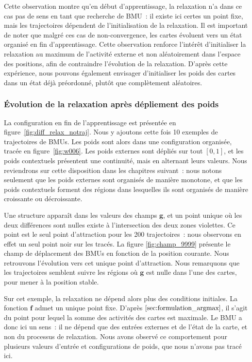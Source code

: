 \documentclass[../main]{subfiles}
\begin{document}
Cette observation montre qu'en début d'apprentissage, la relaxation n'a dans ce cas pas de \og sens \fg{} en tant que recherche de BMU~: il existe ici certes un point fixe, mais les trajectoires dépendent de l'initialisation de la relaxation. 
Il est important de noter que malgré ces cas de non-convergence, les cartes évoluent vers un état organisé en fin d'apprentissage. Cette observation renforce l'intérêt d'initialiser la relaxation au maximum de l'activité externe et non aléatoirement dans l'espace des positions, afin de contraindre l'évolution de la relaxation.
D'après cette expérience, nous pouvons également envisager d'initialiser les poids des cartes dans un état déjà préordonné, plutôt que complètement aléatoires.

\subsubsection{\'Evolution de la relaxation après dépliement des poids}

La configuration en fin de l'apprentissage est présentée en figure~\ref{fig:diff_relax_notraj}. Nous y ajoutons cette fois 10 exemples de trajectoires de BMUs.
Les poids sont alors dans une configuration organisée, tracée en figure~\ref{fig:w006}. 
Les poids externes sont dépliés sur tout $[0,1]$, et les poids contextuels présentent une continuité, mais en alternant leurs valeurs. Nous reviendrons sur cette disposition dans les chapitres suivant~: nous notons seulement que les poids externes sont organisés de manière monotone, et que les poids contextuels forment des régions dans lesquelles ils sont organisés de manière croissante ou décroissante.

Une structure apparaît dans les valeurs des champs $\mathbf{g}$, et un point unique où les deux différences sont nulles existe à l'intersection des deux zones violettes. Ce point est le seul point d'attraction pour les 200 trajectoires~: nous observons en effet un seul point noir sur les tracés.
La figure \ref{fig:champ_9999} présente le champ de déplacement des BMUs en fonction de la position courante. 
Nous retrouvons l'évolution vers cet unique point d'attraction. Nous remarquons que les trajectoires semblent suivre les régions où $\mathbf{g}$ est nulle dans l'une des cartes, pour mener à la position stable. 

Sur cet exemple, la relaxation ne dépend alors plus des conditions initiales. La fonction $\mathbf{f}$ admet un unique point fixe. D'après $\ref{sec:formulation_argmax}$, il s'agit du point pour lequel la somme des activités des cartes est maximale. Le BMU a donc ici un sens~: il ne dépend que des entrées externes et de l'état de la carte, et non du processus de relaxation.
Nous avons observé ce comportement pour plusieurs valeurs d'entrée et configurations de poids, que nous n'avons pas tracé ici. 
\end{document}
